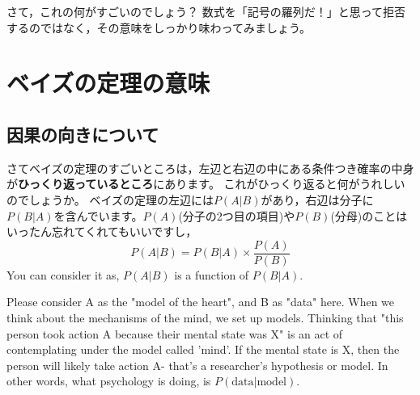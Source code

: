 \documentclass{ltjsbook}
\begin{document}
さて，これの何がすごいのでしょう？ 数式を「記号の羅列だ！」と思って拒否するのではなく，その意味をしっかり味わってみましょう。

\section{ベイズの定理の意味}
\subsection{因果の向きについて}
さてベイズの定理のすごいところは，左辺と右辺の中にある条件つき確率の中身が\textbf{ひっくり返っているところ}にあります。
これがひっくり返ると何がうれしいのでしょうか。
ベイズの定理の左辺には$P(A|B)$があり，右辺は分子に$P(B|A)$を含んでいます。$P(A)$(分子の2つ目の項目)や$P(B)$(分母)のことはいったん忘れてくれてもいいですし，
\[ P(A|B) = P(B|A) \times \frac{P(A)}{P(B)}\]
You can consider it as, $P(A|B)$ is a function of $P(B|A)$.

Please consider A as the "model of the heart", and B as "data" here.
When we think about the mechanisms of the mind, we set up models. Thinking that "this person took action A because their mental state was X" is an act of contemplating under the model called 'mind'. If the mental state is X, then the person will likely take action A- that's a researcher's hypothesis or model. In other words, what psychology is doing, is $ P (\mbox{data} | \mbox{model}) $.
\end{document}
